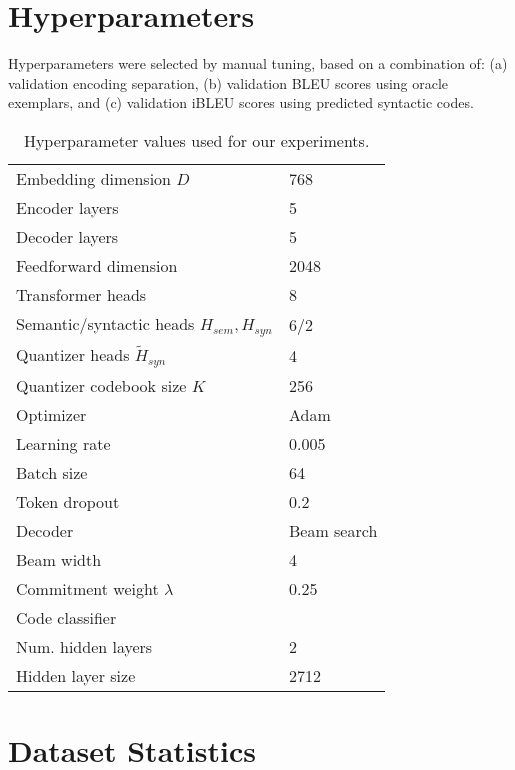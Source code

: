 \documentclass[11pt,a4paper]{article}
\begin{document}



\clearpage
\appendix

\section{Hyperparameters}
\label{app:hyperparams}

Hyperparameters were selected by manual tuning, based on a combination
of: (a) validation encoding separation, (b) validation BLEU scores
using oracle exemplars, and (c) validation iBLEU scores using
predicted syntactic codes.

\begin{table}[ht]
    \centering
\small
    \begin{tabular}{l|p{2cm}}
    Embedding dimension $D$ & 768 \\
    Encoder layers & 5 \\
    Decoder layers & 5 \\
    Feedforward dimension & 2048 \\
    Transformer heads & 8 \\
    Semantic/syntactic heads $H_{sem},H_{syn}$ & 6/2 \\
    Quantizer heads $\tilde{H}_{syn}$ & 4 \\
    Quantizer codebook size $K$& 256 \\
    Optimizer & Adam \cite{adam} \\
    Learning rate & 0.005 \\
    Batch size & 64 \\
    Token dropout & 0.2 \cite{tokendropout} \\
    Decoder & Beam search \\
    Beam width & 4 \\
    Commitment weight $\lambda$ & 0.25 \\
    \hline
    Code classifier & \\
    Num. hidden layers & 2 \\
    Hidden layer size & 2712 \\
    
    \end{tabular}
    \caption{Hyperparameter values used for our experiments.}
    \label{tab:hyperparams}
\end{table}

\section{Dataset Statistics}
\label{app:dataset}
\end{document}
